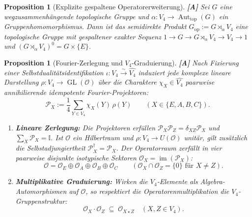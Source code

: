 \documentclass[11pt,a4paper,reqno]{amsart}
\newtheorem{proposition}[theorem]{Proposition}
\theoremstyle{definition}
\theoremstyle{remark}
\begin{document}
	\begin{proposition}[Explizite gespaltene Operatorerweiterung] \cite{Serre1977} \textbf{[A]}
		\label{prop:split_extension}
		Sei $G$ eine wegzusammenh\"angende topologische Gruppe und $\alpha: V_4 \to \operatorname{Aut}_{\mathrm{top}}(G)$ ein Gruppenhomomorphismus. Dann ist das semidirekte Produkt $G_{\mathrm{op}} := G \rtimes_\alpha V_4$ eine topologische Gruppe mit gespaltener exakter Sequenz $1 \to G \to G \rtimes_\alpha V_4 \to V_4 \to 1$ und $(G \rtimes_\alpha V_4)^0 = G \times \{E\}$.
	\end{proposition}
	
	\begin{proposition}[Fourier-Zerlegung und $V_4$-Graduierung] \cite{Serre1977} \textbf{[A]}
		Nach Fixierung einer Selbstdualit\"atsidentifikation $\iota: V_4 \xrightarrow{\sim} \widehat{V_4}$ induziert jede komplexe lineare Darstellung $\rho: V_4 \to \operatorname{GL}(\mathcal{O})$ \"uber die Charaktere $\chi_X \in \widehat{V_4}$ paarweise annihilierende idempotente Fourier-Projektoren:
		\begin{equation}
			\mathcal{P}_X := \frac{1}{4} \sum_{Y \in V_4} \chi_X(Y) \, \rho(Y) \qquad (X \in \{E,A,B,C\}).
		\end{equation}
		\begin{enumerate}
			\item \textbf{Lineare Zerlegung:} Die Projektoren erf\"ullen $\mathcal{P}_X \mathcal{P}_Z = \delta_{XZ} \mathcal{P}_X$ und $\sum_X \mathcal{P}_X = \mathbb{I}$. Ist $\mathcal{O}$ ein Hilbertraum und $\rho: V_4 \to U(\mathcal{O})$ unit\"ar, gilt zus\"atzlich die Selbstadjungiertheit $\mathcal{P}_X^\dagger = \mathcal{P}_X$. Der Operatorraum zerf\"allt in vier paarweise disjunkte isotypische Sektoren $\mathcal{O}_X = \operatorname{im}(\mathcal{P}_X)$:
			\begin{equation}
				\mathcal{O} = \mathcal{O}_E \oplus \mathcal{O}_A \oplus \mathcal{O}_B \oplus \mathcal{O}_C \qquad (\mathcal{O}_X \cap \mathcal{O}_Z = \{0\} \text{ f\"ur } X \neq Z).
			\end{equation}
			\item \textbf{Multiplikative Graduierung:} Wirken die $V_4$-Elemente als Algebra-Automorphismen auf $\mathcal{O}$, so respektiert die Operatorenmultiplikation die $V_4$-Gruppenstruktur:
			\begin{equation}
				\boxed{ \mathcal{O}_X \cdot \mathcal{O}_Z \;\subseteq\; \mathcal{O}_{X \star Z} } \quad (X,Z \in V_4).
			\end{equation}
		\end{enumerate}
	\end{proposition}
	
\end{document}
